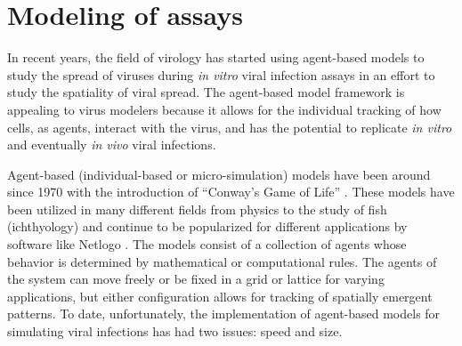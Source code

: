 \section{Modeling of assays}

In recent years, the field of virology has started using agent-based models to study the spread of viruses during \emph{in vitro} viral infection assays \citep{beauchemin_simple_2005,alvarado_cellular-level_2018,wodarz_laws_2014,tong_development_2015,whitman20,goyal16,itakura10,wasik14} in an effort to study the spatiality of viral spread. The agent-based model framework is appealing to virus modelers because it allows for the individual tracking of how cells, as agents, interact with the virus, and has the potential to replicate \emph{in vitro} and eventually \emph{in vivo} viral infections. 

Agent-based (individual-based or micro-simulation) models have been around since 1970 with the introduction of ``Conway's Game of Life'' \citep{gardner70}. These models have been utilized in many different fields from physics to the study of fish (ichthyology) \citep{owusu20} and continue to be popularized for different applications by software like Netlogo \citep{nogare20,chiacchio14}. The models consist of a collection of agents whose behavior is determined by mathematical or computational rules. The agents of the system can move freely \citep{beauchemin07} or be fixed in a grid or lattice \citep{beauchemin_simple_2005} for varying applications, but either configuration allows for tracking of spatially emergent patterns. To date, unfortunately, the implementation of agent-based models for simulating viral infections has had two issues: speed and size.

